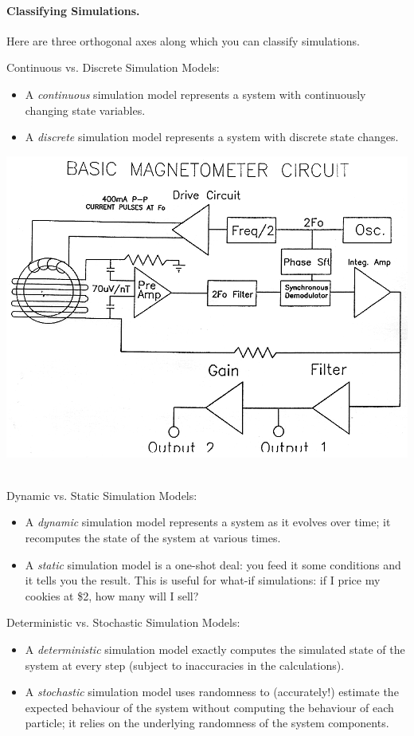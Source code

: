 \paragraph{Classifying Simulations.}
Here are three orthogonal axes along which you can classify simulations.

Continuous vs. Discrete Simulation Models:
\begin{itemize}
\item A \emph{continuous} simulation model represents a system with continuously changing state variables.
\item A \emph{discrete} simulation model represents a system with discrete state changes.
\end{itemize}

\begin{center}
\includegraphics[width=.7\textwidth]{images/fig6}~\cite{magneto}
\end{center}

Dynamic vs. Static Simulation Models: 
\begin{itemize}
\item A \emph{dynamic} simulation model represents a system as it evolves over time; it recomputes the state of the system at various times.
\item A \emph{static} simulation model is a one-shot deal: you feed it some conditions and it tells you the result. This is useful for what-if simulations: if I price my cookies at \$2, how many will I sell?
\end{itemize}

Deterministic vs. Stochastic Simulation Models:
\begin{itemize}
\item A \emph{deterministic} simulation model exactly computes the simulated state of the system at every step (subject to inaccuracies in the calculations).
\item A \emph{stochastic} simulation model uses randomness to (accurately!) estimate the expected behaviour of the system without computing the behaviour of each particle; it relies on the underlying randomness of the system components.
\end{itemize}

